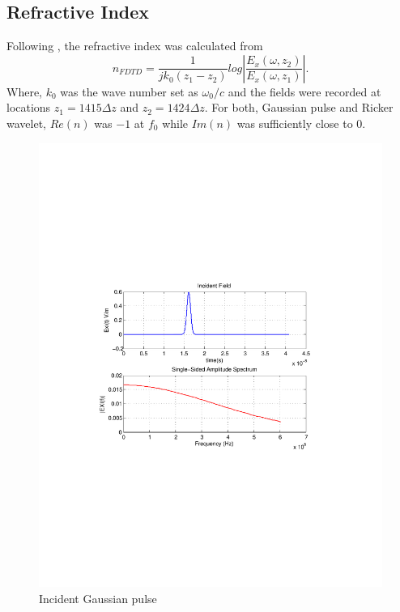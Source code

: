 \documentclass{article}
\begin{document}
\subsection{Refractive Index}
Following \cite{DNG-Ehud-Ziol}, the refractive index was calculated from
\begin{equation}
n_{FDTD} = \dfrac{1}{jk_0(z_1-z_2)}log\left|\dfrac{E_x(\omega,z_2)}{E_x(\omega,z_1)}\right|.
\label{Refractive-Index-FDTD}
\end{equation}
Where, $k_0$ was the wave number set as $\omega_0/c$ and the fields were recorded at locations $z_1=1415\Delta z$ and $z_2=1424\Delta z$. For both, Gaussian pulse and Ricker wavelet, $Re(n)$ was $-1$ at $f_0$ while $Im(n)$ was sufficiently close to $0$.
\begin{figure}[t!]
\centering
\includegraphics[scale=0.55, trim=3.5cm 8.7cm 4.5cm 8.85cm, clip]{Figures/FigCh03_IncidentFieldGaussian.pdf}
\caption{Incident Gaussian pulse}
\label{1DDNG-IncidentField-Gaussian}
\end{figure}
\end{document}
